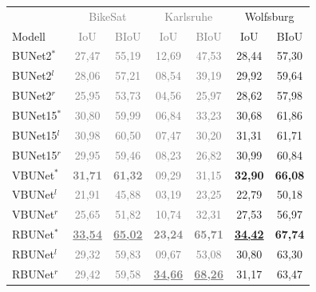 \begin{table}[ht]
	\centering
	\begin{tabular}{l|cc|cc|cc}
        & \multicolumn{2}{c|}{\textcolor{gray}{BikeSat}} & \multicolumn{2}{c|}{\textcolor{gray}{Karlsruhe}} & \multicolumn{2}{c}{Wolfsburg} \\
		Modell & \textcolor{gray}{\ac{IoU}} & \textcolor{gray}{\ac{BIoU}} & \textcolor{gray}{\ac{IoU}} & \textcolor{gray}{\ac{BIoU}} & \ac{IoU} & \ac{BIoU} \\
		\toprule
        BUNet2$^*$ & \textcolor{gray}{27,47} & \textcolor{gray}{55,19} & \textcolor{gray}{12,69} & \textcolor{gray}{47,53} &  28,44 & 57,30 \\
        BUNet2$^l$ & \textcolor{gray}{28,06} & \textcolor{gray}{57,21} & \textcolor{gray}{08,54} & \textcolor{gray}{39,19} &  29,92 & 59,64 \\
        BUNet2$^r$ & \textcolor{gray}{25,95} & \textcolor{gray}{53,73} & \textcolor{gray}{04,56} & \textcolor{gray}{25,97} &  28,62 & 57,98 \\
		\midrule

        BUNet15$^*$ & \textcolor{gray}{30,80} & \textcolor{gray}{59,99} & \textcolor{gray}{06,84} & \textcolor{gray}{33,23} &  30,68 & 61,86 \\
        BUNet15$^l$ & \textcolor{gray}{30,98} & \textcolor{gray}{60,50} & \textcolor{gray}{07,47} & \textcolor{gray}{30,20} &  31,31 & 61,71 \\
        BUNet15$^r$ & \textcolor{gray}{29,95} & \textcolor{gray}{59,46} & \textcolor{gray}{08,23} & \textcolor{gray}{26,82} &  30,99 & 60,84 \\
		\midrule

        VBUNet$^*$ & \textcolor{gray}{\textbf{31,71}} & \textcolor{gray}{\textbf{61,32}} & \textcolor{gray}{09,29} & \textcolor{gray}{31,15} &  \textbf{32,90} & \textbf{66,08} \\
        VBUNet$^l$ & \textcolor{gray}{21,91} & \textcolor{gray}{45,88} & \textcolor{gray}{03,19} & \textcolor{gray}{23,25} &  22,79 & 50,18 \\
        VBUNet$^r$ & \textcolor{gray}{25,65} & \textcolor{gray}{51,82} & \textcolor{gray}{10,74} & \textcolor{gray}{32,31} &  27,53 & 56,97 \\
		\midrule

        RBUNet$^*$ & \textcolor{gray}{\underline{\textbf{33,54}}} & \textcolor{gray}{\underline{\textbf{65,02}}} & \textcolor{gray}{\textbf{23,24}} & \textcolor{gray}{\textbf{65,71}} &  \underline{\textbf{34,42}} & \textbf{67,74} \\
        RBUNet$^l$ & \textcolor{gray}{29,32} & \textcolor{gray}{59,83} & \textcolor{gray}{09,67} & \textcolor{gray}{53,08} &  30,80 & 63,30 \\
        RBUNet$^r$ & \textcolor{gray}{29,42} & \textcolor{gray}{59,58} & \textcolor{gray}{\underline{\textbf{34,66}}} & \textcolor{gray}{\underline{\textbf{68,26}}} &  31,17 & 63,47 \\
		\midrule


\end{tabular}
\end{table}
